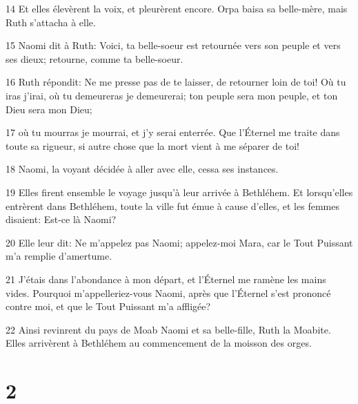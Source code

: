 \par 14 Et elles élevèrent la voix, et pleurèrent encore. Orpa baisa sa belle-mère, mais Ruth s'attacha à elle.
\par 15 Naomi dit à Ruth: Voici, ta belle-soeur est retournée vers son peuple et vers ses dieux; retourne, comme ta belle-soeur.
\par 16 Ruth répondit: Ne me presse pas de te laisser, de retourner loin de toi! Où tu iras j'irai, où tu demeureras je demeurerai; ton peuple sera mon peuple, et ton Dieu sera mon Dieu;
\par 17 où tu mourras je mourrai, et j'y serai enterrée. Que l'Éternel me traite dans toute sa rigueur, si autre chose que la mort vient à me séparer de toi!
\par 18 Naomi, la voyant décidée à aller avec elle, cessa ses instances.
\par 19 Elles firent ensemble le voyage jusqu'à leur arrivée à Bethléhem. Et lorsqu'elles entrèrent dans Bethléhem, toute la ville fut émue à cause d'elles, et les femmes disaient: Est-ce là Naomi?
\par 20 Elle leur dit: Ne m'appelez pas Naomi; appelez-moi Mara, car le Tout Puissant m'a remplie d'amertume.
\par 21 J'étais dans l'abondance à mon départ, et l'Éternel me ramène les mains vides. Pourquoi m'appelleriez-vous Naomi, après que l'Éternel s'est prononcé contre moi, et que le Tout Puissant m'a affligée?
\par 22 Ainsi revinrent du pays de Moab Naomi et sa belle-fille, Ruth la Moabite. Elles arrivèrent à Bethléhem au commencement de la moisson des orges.

\chapter{2}

